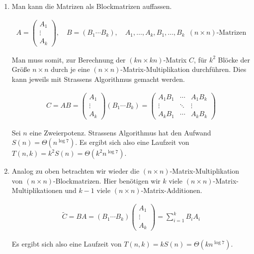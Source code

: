 \begin{solution}

\phantom{}

\begin{enumerate}[label = (\alph*)]

  \item Man kann die Matrizen als Blockmatrizen auffassen.
  
  \begin{align*}
    A
    =
    \begin{pmatrix}
      A_1 \\ \vdots \\ A_k
    \end{pmatrix},
    \quad
    B
    =
    (B_1 \cdots B_k),
    \quad
    A_1, \dots, A_k,
    B_1, \dots, B_k \enspace
    (n \times n) \text{-Matrizen}
  \end{align*}

  Man muss somit, zur Berechnung der $(kn \times kn)$-Matrix $C$, für $k^2$ Blöcke der Größe $n \times n$ durch je eine $(n \times n)$-Matrix-Multiplikation durchführen.
  Dies kann jeweils mit Strassens Algorithmus gemacht werden.

  \begin{align*}
    C
    =
    AB
    =
    \begin{pmatrix}
      A_1 \\ \vdots \\ A_k
    \end{pmatrix}
    (B_1 \cdots B_k)
    =
    \begin{pmatrix}
      A_1 B_1 & \cdots & A_1 B_k \\
      \vdots  & \ddots & \vdots \\
      A_k B_1 & \cdots & A_k B_k
    \end{pmatrix}
  \end{align*}
  
  Sei $n$ eine Zweierpotenz.
  Strassens Algorithmus hat den Aufwand $S(n) = \Theta(n^{\log 7})$.
  Es ergibt sich also eine Laufzeit von $T(n, k) = k^2 S(n) = \Theta(k^2 n^{\log 7})$.

  \item Analog zu oben betrachten wir wieder die $(n \times n)$-Matrix-Multiplikation von $(n \times n)$-Blockmatrizen.
  Hier benötigen wir $k$ viele $(n \times n)$-Matrix-Multiplikationen und $k - 1$ viele $(n \times n)$-Matrix-Additionen.

  \begin{align*}
    \tilde{C}
    =
    BA
    =
    (B_1 \cdots B_k)
    \begin{pmatrix}
      A_1 \\ \vdots \\ A_k
    \end{pmatrix}
    =
    \sum_{i=1}^k
    B_i A_i
  \end{align*}

  Es ergibt sich also eine Laufzeit von $T(n, k) = k S(n) = \Theta(k n^{\log 7})$.

\end{enumerate}

\end{solution}

